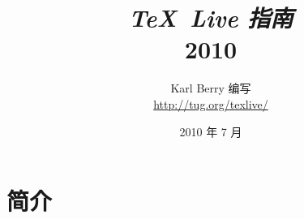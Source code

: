 \documentclass{article}
\begin{document}
\title{%
  {\huge \textit{\TeX\ Live 指南}\\\smallskip}%
  {\LARGE \textsf{\TL{} 2010}}
}

\author{Karl Berry 编写 \\[3mm]
        \url{http://tug.org/texlive/}
       }

\date{2010 年 7 月}

\maketitle

\begin{multicols}{2}
\tableofcontents
\end{multicols}

\section{简介}
\label{sec:intro}
\end{document}
